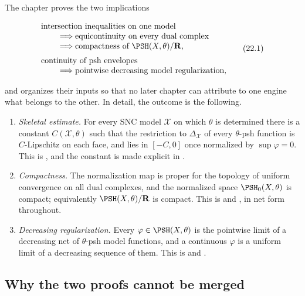 The chapter proves the two implications

\[
 \begin{aligned}
 &\text{intersection inequalities on one model}\\[-1mm]
 &\qquad\Longrightarrow
   \text{equicontinuity on every dual complex}\\[-1mm]
 &\qquad\Longrightarrow
   \text{compactness of }\PSH(X,\theta)/\mathbf R,\\[1mm]
 &\text{continuity of psh envelopes}\\[-1mm]
 &\qquad\Longrightarrow
   \text{pointwise decreasing model regularization},
 \end{aligned}
\tag{22.1}\label{eq:ch22-architecture}
\]

and organizes their inputs so that no later chapter can attribute to one
engine what belongs to the other.  In detail, the outcome is the following.

\begin{enumerate}
\item \emph{Skeletal estimate.}  For every SNC model $\mathcal X$ on which
$\theta$ is determined there is a constant $C(\mathcal X,\theta)$ such
that the restriction to $\Delta_{\mathcal X}$ of every $\theta$-psh
function is $C$-Lipschitz on each face, and lies in $[-C,0]$ once
normalized by $\sup\varphi=0$.  This is
, and the constant is made explicit in
.
\item \emph{Compactness.}  The normalization map is proper for the topology
of uniform convergence on all dual complexes, and the normalized space
$\PSH_0(X,\theta)$ is compact; equivalently
$\PSH(X,\theta)/\mathbf R$ is compact.  This is
 and
, in net form throughout.
\item \emph{Decreasing regularization.}  Every $\varphi\in\PSH(X,\theta)$
is the pointwise limit of a decreasing net of $\theta$-psh model
functions, and a continuous $\varphi$ is a uniform limit of a decreasing
sequence of them.  This is
 and
.
\end{enumerate}

\subsection{Why the two proofs cannot be merged}
\label{sec:ch22-two-engines}

